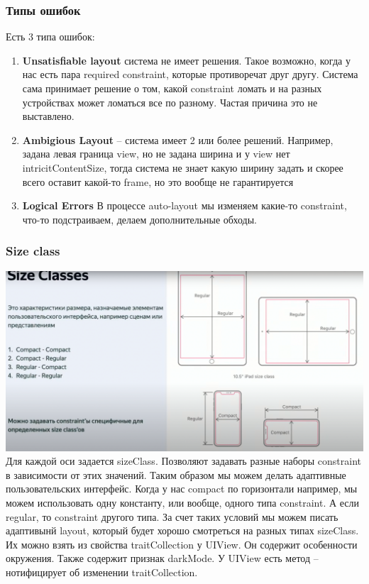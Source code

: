 \documentclass{article}
\begin{document}
    \subsubsection{Типы ошибок}
    Есть 3 типа ошибок:
    \begin{enumerate}
        \item \textbf{Unsatisfiable layout} система не имеет решения. Такое возможно, когда у нас есть пара required constraint, которые противоречат друг другу. Система сама принимает решение о том, какой constraint ломать и на разных устройствах может ломаться все по разному. Частая причина это  не выставлено. 
        \item \textbf{Ambigious Layout} -- система имеет 2 или более решений. Например, задана левая граница view, но не задана ширина и у view нет intricitContentSize, тогда система не знает какую ширину задать и скорее всего оставит какой-то frame, но это вообще не гарантируется
        \item \textbf{Logical Errors} В процессе auto-layout мы изменяем какие-то constraint, что-то подстраиваем, делаем дополнительные обходы. 
    \end{enumerate}
    \subsubsection{Size class}
    \includegraphics[scale = 0.2]{pic/Снимок экрана 2023-07-31 в 22.37.05.png}
    \newline
    Для каждой оси задается sizeClass. Позволяют задавать разные наборы constraint в зависимости от этих значений. Таким образом мы можем делать адаптивные пользовательских интерфейс. Когда у нас compact по горизонтали например, мы можем использовать одну константу, или вообще, одного типа constraint. А если regular, то constraint другого типа. За счет таких условий мы можем писать адаптивынй layout, который будет хорошо смотреться на разных типах sizeClass. 
    \newline
    Их можно взять из свойства traitCollection у UIView. Он содержит особенности окружения. Также содержит признак darkMode. У UIView есть метод  -- нотифицирует об изменении traitCollection.
\end{document}
